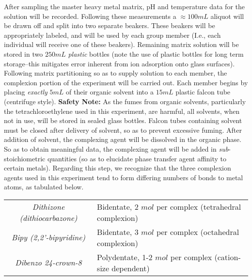 \documentclass[letterpaper,12pt]{article}
\begin{document}
	\indent
	After sampling the master heavy metal matrix, pH and temperature data for the solution will be recorded. Following these measurements a $\approx100mL$ aliquot will be drawn off and split into two separate beakers. These beakers will be appropriately labeled, and will be used by each group member (I.e., each individual will receive one of these beakers). Remaining matrix solution will be stored in two $250mL$ \emph{plastic} bottles (note the use of plastic bottles for long term storage--this mitigates error inherent from ion adsorption onto glass surfaces).
	\\
	\indent
	Following matrix partitioning so as to supply solution to each member, the complexion portion of the experiment will be carried out. Each member begins by placing \emph{exactly} $5mL$ of their organic solvent into a $15mL$ plastic falcon tube (centrifuge style). \textbf{Safety Note:} As the fumes from organic solvents, particularly the tetrachloroethylene used in this experiment, are harmful, all solvents, when not in use, will be stored in sealed glass bottles. Falcon tubes containing solvent must be closed after delivery of solvent, so as to prevent excessive fuming. After addition of solvent, the complexing agent will be dissolved in the organic phase. So as to obtain meaningful data, the complexing agent will be added in \emph{sub}-stoichiometric quantities (so as to elucidate phase transfer agent affinity to certain metals). Regarding this step, we recognize that the three complexion agents used in this experiment tend to form differing numbers of bonds to metal atoms, as tabulated below.  
	\begin{center}
		\begin{tabular}[htbp]{c@{ : }l}
			\emph{Dithizone}\cite{c4} \emph{(dithiocarbazone)} & Bidentate, 2 $mol$ per complex (tetrahedral complexion)\\
			\emph{Bipy (2,2'-bipyridine)} & Bidentate, 3 $mol$ per complex (octahedral complexion)\\
			\emph{Dibenzo 24-crown-8}\cite{c5} & Polydentate\cite{c3}, 1-2 $mol$ per complex (cation-size dependent)
		\end{tabular}
	\end{center}
	
\end{document}
